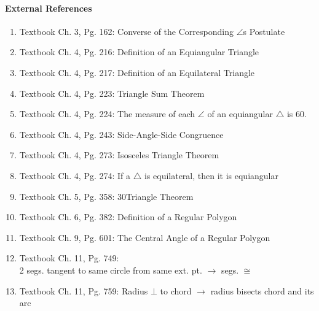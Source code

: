 \documentclass[letterpaper,12pt,twoside]{report}
\begin{document}
	
	\paragraph{External References}
	\begin{enumerate}
		\item Textbook Ch. 3, Pg. 162: Converse of the Corresponding $\angle$s Postulate
		\item Textbook Ch. 4, Pg. 216: Definition of an Equiangular Triangle
		\item Textbook Ch. 4, Pg. 217: Definition of an Equilateral Triangle
		
		\item Textbook Ch. 4, Pg. 223: Triangle Sum Theorem
		\item Textbook Ch. 4, Pg. 224: The measure of each $\angle$ of an equiangular $\triangle$ is 60\textdegree.
		\item Textbook Ch. 4, Pg. 243: Side-Angle-Side Congruence
		\item Textbook Ch. 4, Pg. 273: Isosceles Triangle Theorem
		\item Textbook Ch. 4, Pg. 274: If a $\triangle$ is equilateral, then it is equiangular
		\item Textbook Ch. 5, Pg. 358: 30\textdegree \space Triangle Theorem
		\item Textbook Ch. 6, Pg. 382: Definition of a Regular Polygon
		\item Textbook Ch. 9, Pg. 601: The Central Angle of a Regular Polygon
		\item Textbook Ch. 11, Pg. 749: \\2 segs. tangent to same circle from same ext. pt. $\rightarrow$ segs. $\cong$
		\item Textbook Ch. 11, Pg. 759: Radius $\bot$ to chord $\rightarrow$ radius bisects chord and its arc
	\end{enumerate}
\end{document}

